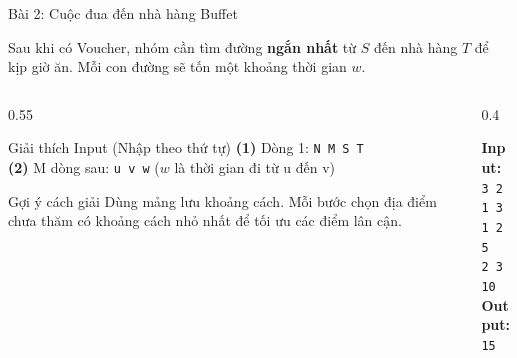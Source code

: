 \documentclass[10pt, xcolor={dvipsnames}]{beamer}
\begin{document}
\begin{frame}{Bài 2: Cuộc đua đến nhà hàng Buffet}
    \begin{tcolorbox}[colback=lightorange!5, colframe=lightorange, title=\textbf{Cốt truyện}]
        \scriptsize 
        Sau khi có Voucher, nhóm cần tìm đường \textbf{ngắn nhất} từ $S$ đến nhà hàng $T$ để kịp giờ ăn. Mỗi con đường sẽ tốn một khoảng thời gian $w$.
    \end{tcolorbox}

    \begin{columns}[T]
        \begin{column}{0.55\textwidth}
            \begin{block}{\scriptsize Giải thích Input (Nhập theo thứ tự)}
                \tiny 
                \textbf{(1)} Dòng 1: \texttt{N M S T}\\
                \textbf{(2)} M dòng sau: \texttt{u v w} ($w$ là thời gian đi từ u đến v)
            \end{block}
            \begin{alertblock}{\scriptsize Gợi ý cách giải}
                \tiny Dùng mảng lưu khoảng cách. Mỗi bước chọn địa điểm chưa thăm có khoảng cách nhỏ nhất để tối ưu các điểm lân cận.
            \end{alertblock}
        \end{column}

        \begin{column}{0.4\textwidth}
            \begin{tcolorbox}[colback=white, colframe=lightorange, title=\tiny Sample Test, arc=0mm]
                \tiny
                \textbf{Input:}\\
                \texttt{3 2 1 3}\\
                \texttt{1 2 5}\\
                \texttt{2 3 10}\\
                \vspace{0.1cm}
                \textbf{Output:}\\
                \texttt{15}
            \end{tcolorbox}
        \end{column}
    \end{columns}
\end{frame}
\end{document}

